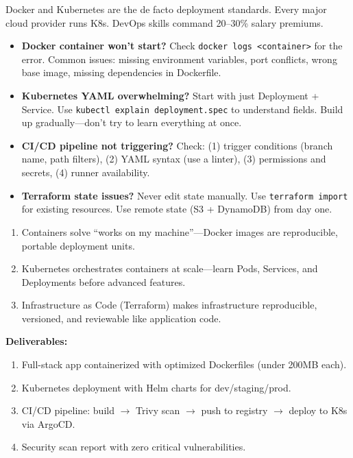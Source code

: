 \documentclass[11pt, a4paper, oneside]{report}
\newcommand{\arrow}{$\rightarrow$}
\begin{document}
\begin{realworldbox}
Docker and Kubernetes are the de facto deployment standards. Every major cloud provider runs K8s. DevOps skills command 20--30\% salary premiums.
\end{realworldbox}


\begin{stuckbox}
\begin{itemize}[leftmargin=*]
\item \textbf{Docker container won't start?} Check \texttt{docker logs <container>} for the error. Common issues: missing environment variables, port conflicts, wrong base image, missing dependencies in Dockerfile.
\item \textbf{Kubernetes YAML overwhelming?} Start with just Deployment + Service. Use \texttt{kubectl explain deployment.spec} to understand fields. Build up gradually---don't try to learn everything at once.
\item \textbf{CI/CD pipeline not triggering?} Check: (1) trigger conditions (branch name, path filters), (2) YAML syntax (use a linter), (3) permissions and secrets, (4) runner availability.
\item \textbf{Terraform state issues?} Never edit state manually. Use \texttt{terraform import} for existing resources. Use remote state (S3 + DynamoDB) from day one.
\end{itemize}
\end{stuckbox}


\begin{takeawaybox}
\begin{enumerate}[leftmargin=*]
\item Containers solve ``works on my machine''---Docker images are reproducible, portable deployment units.
\item Kubernetes orchestrates containers at scale---learn Pods, Services, and Deployments before advanced features.
\item Infrastructure as Code (Terraform) makes infrastructure reproducible, versioned, and reviewable like application code.
\end{enumerate}
\end{takeawaybox}

\begin{milestonebox}
\textbf{Deliverables:}
\begin{enumerate}[leftmargin=*]
\item Full-stack app containerized with optimized Dockerfiles (under 200MB each).
\item Kubernetes deployment with Helm charts for dev/staging/prod.
\item CI/CD pipeline: build \arrow{} Trivy scan \arrow{} push to registry \arrow{} deploy to K8s via ArgoCD.
\item Security scan report with zero critical vulnerabilities.
\end{enumerate}
\end{milestonebox}
\end{document}
